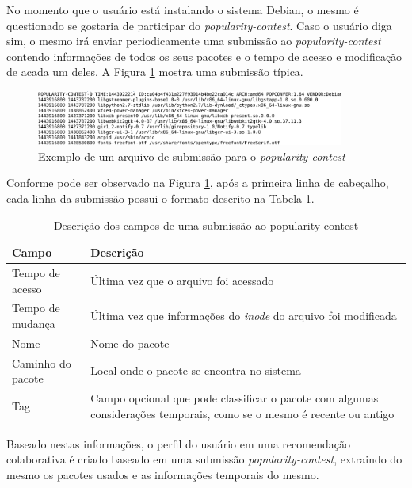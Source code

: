 No momento que o usuário está instalando o sistema Debian, o mesmo é
questionado se gostaria de participar do
\textit{popularity-contest}. Caso o usuário diga sim, o mesmo irá enviar periodicamente
uma submissão ao \textit{popularity-contest} contendo informações de todos os seus
pacotes e o tempo de acesso e modificação de acada um deles. A Figura
\ref{fig:submissao_popcon} mostra uma submissão típica.

\begin{figure}[h]
  \centering
  \includegraphics[width=0.9\textwidth]{figuras/submissao_popcon.eps}
  \caption{Exemplo de um arquivo de submissão para o
    \textit{popularity-contest}}
  \label{fig:submissao_popcon}
\end{figure}

Conforme pode ser observado na Figura \ref{fig:submissao_popcon}, após a
primeira linha de cabeçalho, cada linha da submissão possui o formato descrito
na Tabela \ref{tab:submissao_popcon}.

\begin{table}[h!]
\centering
\newcommand\T{\rule{0pt}{2.8ex}}
\newcommand\B{\rule[-1.8ex]{0pt}{0pt}}
\begin{tabularx}{15cm}{| l | X |}
\hline
\rowcolor[HTML]{EFEFEF}
{\textbf{Campo}} & \textbf{Descrição} \\ \hline
{Tempo de acesso}  & Última vez que o arquivo foi acessado \\ \hline
{Tempo de mudança}   & Última vez que informações do \textit{inode} do arquivo foi
                       modificada\\ \hline
{Nome}   & Nome do pacote                  \\ \hline
{Caminho do pacote}   & Local onde o pacote se encontra no sistema \\ \hline
{Tag}   & Campo opcional que pode classificar o pacote com algumas considerações
temporais, como se o mesmo é recente ou antigo\\ \hline
\end{tabularx}
\caption{Descrição dos campos de uma submissão ao popularity-contest}
\label{tab:submissao_popcon}
\end{table}

Baseado nestas informações, o perfil do usuário em uma recomendação colaborativa
é criado baseado em uma submissão \textit{popularity-contest}, extraindo do mesmo os pacotes usados e
as informações temporais do mesmo.

